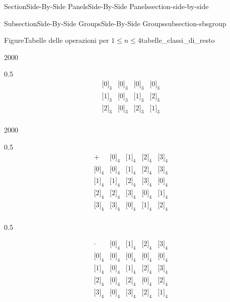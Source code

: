 \documentclass[twoside,10pt,]{article}
\numberwithin{equation}{section}
\newcommand{\class}[2][\sim]{\lbrack #2\rbrack_{#1}}
\newcommand{\amp}{&}
\begin{document}
\begin{sectionptx}{Section}{Side-By-Side Panels}{}{Side-By-Side Panels}{}{}{section-side-by-side}
\begin{subsectionptx}{Subsection}{Side-By-Side Groups}{}{Side-By-Side Groups}{}{}{subsection-sbsgroup}
\begin{figureptx}{Figure}{Tabelle delle operazioni per \(1\le n\le 4\)}{tabelle_classi_di_resto}{}
\begin{sidebyside}{2}{0}{0}{0}
\begin{sbspanel}{0.5}
\begin{equation*}
\begin{array}{c|ccc}
\hline
\class[3]{0} \amp \class[3]{0} \amp \class[3]{0} \amp \class[3]{0} \\
\class[3]{1} \amp \class[3]{0} \amp \class[3]{1} \amp \class[3]{2} \\
\class[3]{2} \amp \class[3]{0} \amp \class[3]{2} \amp \class[3]{1} \\
\end{array}
\end{equation*}
%
\end{sbspanel}%
\end{sidebyside}%
\begin{sidebyside}{2}{0}{0}{0}%
\begin{sbspanel}{0.5}%
%
\begin{equation*}
\begin{array}{c|cccc}
+ \amp \class[4]{0} \amp \class[4]{1} \amp \class[4]{2} \amp \class[4]{3} \\
\hline
\class[4]{0} \amp \class[4]{0} \amp \class[4]{1} \amp \class[4]{2} \amp \class[4]{3} \\
\class[4]{1} \amp \class[4]{1} \amp \class[4]{2} \amp \class[4]{3} \amp \class[4]{0} \\
\class[4]{2} \amp \class[4]{2} \amp \class[4]{3} \amp \class[4]{0} \amp \class[4]{1} \\
\class[4]{3} \amp \class[4]{3} \amp \class[4]{0} \amp \class[4]{1} \amp \class[4]{2} \\
\end{array}
\end{equation*}
%
\end{sbspanel}%
\begin{sbspanel}{0.5}%
\par
%
\begin{equation*}
\begin{array}{c|cccc}
\cdot \amp \class[4]{0} \amp \class[4]{1} \amp \class[4]{2} \amp \class[4]{3} \\
\hline
\class[4]{0} \amp \class[4]{0} \amp \class[4]{0} \amp \class[4]{0} \amp \class[4]{0} \\
\class[4]{1} \amp \class[4]{0} \amp \class[4]{1} \amp \class[4]{2} \amp \class[4]{3} \\
\class[4]{2} \amp \class[4]{0} \amp \class[4]{2} \amp \class[4]{0} \amp \class[4]{2} \\
\class[4]{3} \amp \class[4]{0} \amp \class[4]{3} \amp \class[4]{2} \amp \class[4]{1} \\
\end{array}
\end{equation*}
%

\end{sbspanel}
\end{sidebyside}
\end{figureptx}
\end{subsectionptx}
\end{sectionptx}
\end{document}
